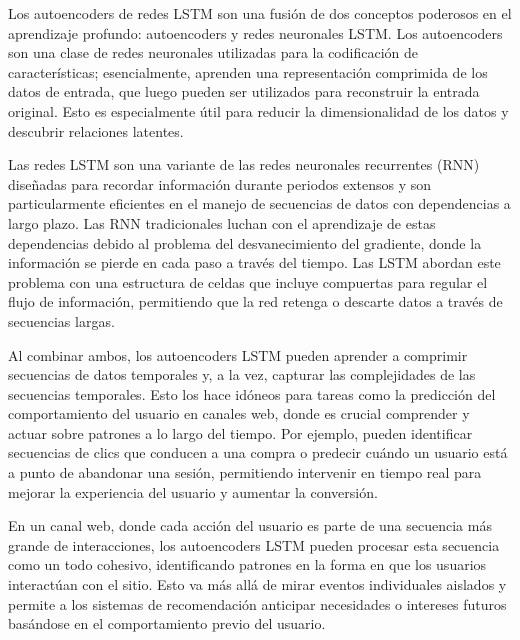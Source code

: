 Los autoencoders de redes LSTM son una fusión de dos conceptos poderosos en el aprendizaje profundo: autoencoders y redes neuronales LSTM. Los autoencoders son una clase de redes neuronales utilizadas para la codificación de características; esencialmente, aprenden una representación comprimida de los datos de entrada, que luego pueden ser utilizados para reconstruir la entrada original. Esto es especialmente útil para reducir la dimensionalidad de los datos y descubrir relaciones latentes.

Las redes LSTM son una variante de las redes neuronales recurrentes (RNN) diseñadas para recordar información durante periodos extensos y son particularmente eficientes en el manejo de secuencias de datos con dependencias a largo plazo. Las RNN tradicionales luchan con el aprendizaje de estas dependencias debido al problema del desvanecimiento del gradiente, donde la información se pierde en cada paso a través del tiempo. Las LSTM abordan este problema con una estructura de celdas que incluye compuertas para regular el flujo de información, permitiendo que la red retenga o descarte datos a través de secuencias largas.

Al combinar ambos, los autoencoders LSTM pueden aprender a comprimir secuencias de datos temporales y, a la vez, capturar las complejidades de las secuencias temporales. Esto los hace idóneos para tareas como la predicción del comportamiento del usuario en canales web, donde es crucial comprender y actuar sobre patrones a lo largo del tiempo. Por ejemplo, pueden identificar secuencias de clics que conducen a una compra o predecir cuándo un usuario está a punto de abandonar una sesión, permitiendo intervenir en tiempo real para mejorar la experiencia del usuario y aumentar la conversión.

En un canal web, donde cada acción del usuario es parte de una secuencia más grande de interacciones, los autoencoders LSTM pueden procesar esta secuencia como un todo cohesivo, identificando patrones en la forma en que los usuarios interactúan con el sitio. Esto va más allá de mirar eventos individuales aislados y permite a los sistemas de recomendación anticipar necesidades o intereses futuros basándose en el comportamiento previo del usuario.

